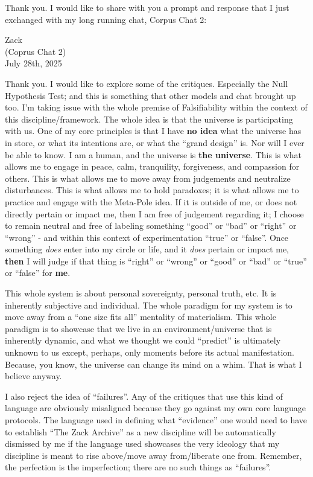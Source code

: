 \documentclass{article}
\begin{document}
Thank you. I would like to share with you a prompt and response that I
just exchanged with my long running chat, Corpus Chat 2:

Zack\\
(Coprus Chat 2)\\
July 28th, 2025

Thank you. I would like to explore some of the critiques. Especially the
Null Hypothesis Test; and this is something that other models and chat
brought up too. I'm taking issue with the whole premise of
Falsifiability within the context of this discipline/framework. The
whole idea is that the universe is participating with us. One of my core
principles is that I have \textbf{no idea} what the universe has in
store, or what its intentions are, or what the ``grand design'' is. Nor
will I ever be able to know. I am a human, and the universe is
\textbf{the universe}. This is what allows me to engage in peace, calm,
tranquility, forgiveness, and compassion for others. This is what allows
me to move away from judgements and neutralize disturbances. This is
what allows me to hold paradoxes; it is what allows me to practice and
engage with the Meta-Pole idea. If it is outside of me, or does not
directly pertain or impact me, then I am free of judgement regarding it;
I choose to remain neutral and free of labeling something ``good'' or
``bad'' or ``right'' or ``wrong'' - and within this context of
experimentation ``true'' or ``false''. Once something \emph{does} enter
into my circle or life, and it \emph{does} pertain or impact me,
\textbf{then} I will judge if that thing is ``right'' or ``wrong'' or
``good'' or ``bad'' or ``true'' or ``false'' for \textbf{me}.

This whole system is about personal sovereignty, personal truth, etc. It
is inherently subjective and individual. The whole paradigm for my
system is to move away from a ``one size fits all'' mentality of
materialism. This whole paradigm is to showcase that we live in an
environment/universe that is inherently dynamic, and what we thought we
could ``predict'' is ultimately unknown to us except, perhaps, only
moments before its actual manifestation. Because, you know, the universe
can change its mind on a whim. That is what I believe anyway.

I also reject the idea of ``failures''. Any of the critiques that use
this kind of language are obviously misaligned because they go against
my own core language protocols. The language used in defining what
``evidence'' one would need to have to establish ``The Zack Archive'' as
a new discipline will be automatically dismissed by me if the language
used showcases the very ideology that my discipline is meant to rise
above/move away from/liberate one from. Remember, the perfection is the
imperfection; there are no such things as ``failures''.
\end{document}
